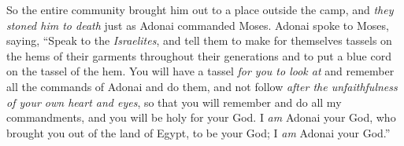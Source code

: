 \begin{biblechapter}
\verse So the entire community brought him out to a place outside the camp, and \textit{they stoned him to death} just as Adonai commanded Moses.
 Adonai spoke to Moses, saying,
\verse “Speak to the \textit{Israelites}, and tell them to make for themselves tassels on the hems of their garments throughout their generations and to put a blue cord on the tassel of the hem.
\verse You will have a tassel \textit{for you to look at} and remember all the commands of Adonai and do them, and not follow \textit{after the unfaithfulness of your own heart and eyes},
\verse so that you will remember and do all my commandments, and you will be holy for your God.
\verse I \textit{am} Adonai your God, who brought you out of the land of Egypt, to be your God; I \textit{am} Adonai your God.”
\end{biblechapter}

